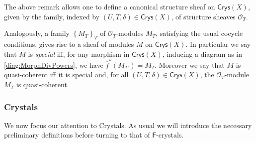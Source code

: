 \documentclass[../Main]{subfiles}
\begin{document}
\begin{rem}[]
	The above remark allows one to define a canonical structure sheaf
	on $\mathsf{Crys}(X)$, given by the family, 
	indexed by $\left(U, T, \delta\right) \in
	\mathsf{Crys}(X)$, of structure sheaves $\mathcal{O}_{ T }$.

	Analogously, a family $\left\{ M_T \right\}_{T}$ 
	of $\mathcal{O}_{ T }$-modules $M_T$, satisfying
	the usual cocycle conditions, gives rise to a sheaf of modules
	$M$ on $\mathsf{Crys}(X)$.
	In particular we say that $M$ is {\em special}
	iff, for any morphism in $\mathsf{Crys}(X)$,
	inducing a diagram as in \cref{diag:MorphDivPowers},
	we have $\overline{f}^*(M_{T'}) = M_T$.
	Moreover we say that $M$ is quasi-coherent iff it is special and, for all
	$\left(U, T, \delta\right) \in \mathsf{Crys}(X)$, the $\mathcal{O}_{ T }$-module
	$M_T$ is quasi-coherent.
\end{rem}


\subsubsection{Crystals}
We now focus our attention to Crystals.
As usual we will introduce the necessary preliminary definitions before 
turning to that of $\mathsf{F}$-crystals.
\end{document}
